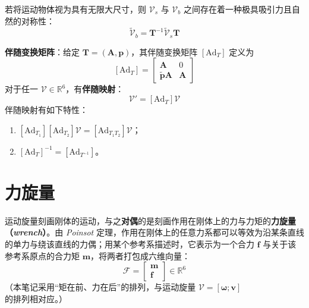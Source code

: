 若将运动物体视为具有无限大尺寸，则 $\mathcal{V}_{s}$ 与 $\mathcal{V}_{b}$ 之间存在着一种极具吸引力且自然的对称性：
\begin{equation}
	\label{eq:运动旋量:对称性}
	\tilde{\mathcal{V}}_{b}=\boldsymbol{T}^{-1}\tilde{\mathcal{V}}_{s}\boldsymbol{T}
\end{equation}

\textbf{伴随变换矩阵}：给定 $\boldsymbol{T}=(\boldsymbol{A},\boldsymbol{p})$，其伴随变换矩阵 $[\mathrm{Ad}_{T}]$ 定义为
\begin{equation}
	\label{eq:运动旋量:伴随矩阵}
	[\mathrm{Ad}_{T}]=\begin{bmatrix}
		\boldsymbol{A} & 0\\
		\tilde{\boldsymbol{p}}\boldsymbol{A} & \boldsymbol{A}
	\end{bmatrix}
\end{equation}
对于任一 $\mathcal{V}\in\mathbb{R}^{6}$，有\textbf{伴随映射}：
\begin{equation}
	\label{eq:运动旋量:伴随映射}
	\mathcal{V}'=[\mathrm{Ad}_{T}]\mathcal{V}
\end{equation}
伴随映射有如下特性：
\begin{enumerate}
	\item $[\mathrm{Ad}_{T_{1}}][\mathrm{Ad}_{T_{2}}]\mathcal{V}=[\mathrm{Ad}_{T_{1}T_{2}}]\mathcal{V}$；
	\item $[\mathrm{Ad}_{T}]^{-1}=[\mathrm{Ad}_{T^{-1}}]$。
\end{enumerate}

\section{力旋量}

运动旋量刻画刚体的运动，与之\textbf{对偶}的是刻画作用在刚体上的力与力矩的\textbf{力旋量（\textit{wrench}）}。由 \textit{Poinsot} 定理，作用在刚体上的任意力系都可以等效为沿某条直线的单力与绕该直线的力偶；用某个参考系描述时，它表示为一个合力 $\boldsymbol{f}$ 与关于该参考系原点的合力矩 $\boldsymbol{m}$，将两者打包成六维向量：
\begin{equation}
	\label{eq:力旋量:定义}
	\mathcal{F}=\begin{bmatrix}
		\boldsymbol{m}\\
		\boldsymbol{f}
	\end{bmatrix}\in\mathbb{R}^{6}
\end{equation}
（本笔记采用“矩在前、力在后”的排列，与运动旋量 $\mathcal{V}=[\boldsymbol{\omega};\boldsymbol{v}]$ 的排列相对应。）


